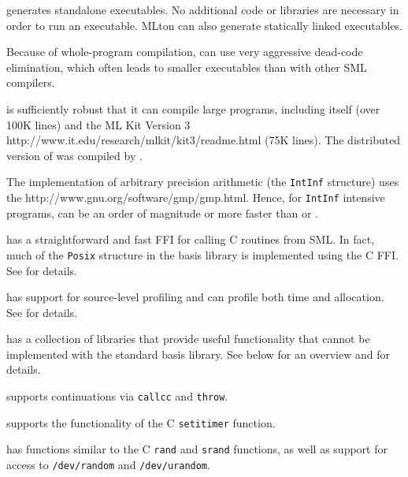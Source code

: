 \begin{description}
{\mlton} generates standalone executables.  No additional code or
libraries are necessary in order to run an executable.  MLton can also generate
statically linked executables.

Because of whole-program compilation, {\mlton} can use very aggressive 
dead-code elimination, which often leads to smaller executables than
with other SML compilers.

{\mlton} is sufficiently robust that it can compile large programs,
including itself (over 100K lines) and the
\htmladdnormallink
  {ML Kit Version 3}
  {http://www.it.edu/research/mlkit/kit3/readme.html}
(75K lines).
The distributed version of {\mlton} was compiled by {\mlton}.

The {\mlton} implementation of arbitrary precision arithmetic (the
{\tt IntInf} structure) uses the
		  {http://www.gnu.org/software/gmp/gmp.html}.
Hence, for {\tt IntInf} intensive programs, {\mlton} can be an order
of magnitude or more faster than {\poly} or {\smlnj}.

{\mlton} has a straightforward and fast FFI for calling C routines
from SML.  In fact, much of the {\tt Posix} structure in the basis library is
implemented using the C FFI.
See  for details.

{\mlton} has support for source-level profiling and can profile both
time and allocation.  See  for details.

{\mlton} has a collection of libraries that provide useful functionality that
cannot be implemented with the standard basis library.  See below for an
overview and  for details.

\begin{description}

{\mlton} supports continuations via {\tt callcc} and {\tt throw}.

{\mlton} supports the functionality of the C {\tt setitimer} function.

{\mlton} has functions similar to the C {\tt rand} and {\tt srand} functions, as
well as support for access to {\tt /dev/random} and {\tt /dev/urandom}.


\end{description}
\end{description}
